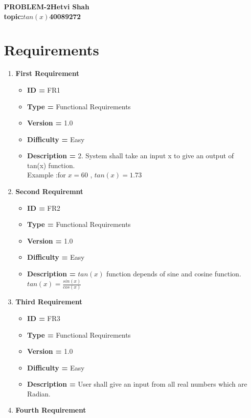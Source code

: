 \documentclass{article}
\begin{document}
\noindent
\Large\textbf{PROBLEM-2}\hfill\textbf{Hetvi Shah}\\
\textbf{topic:$tan(x)$\hfill\textbf{40089272}}
\section*{Requirements}
    \begin{enumerate}\noitemsep
    \item\textbf{First Requirement}
    \begin{itemize}
        \item \textbf{ID = } FR1
        \item \textbf{Type = } Functional Requirements
        \item \textbf{Version = } 1.0
        \item \textbf{Difficulty = } Easy
        \item \textbf{Description = }2.	System shall take an input x to give an output of tan(x) function.\\
        Example :for  $x = 60 $ , $ tan(x) = 1.73$
    \end{itemize}
    \item\textbf{Second Requiremnt}
    \begin{itemize}
        \item \textbf{ID = } FR2
        \item \textbf{Type = } Functional Requirements
        \item \textbf{Version = } 1.0
        \item \textbf{Difficulty = } Easy
        \item \textbf{Description = } $tan(x)$ function depends of sine and cosine function.\\
        $tan(x) = \frac{sin(x)}{cos(x)}$
    \end{itemize}
    \item\textbf{Third Requirement}
    \begin{itemize}
        \item \textbf{ID = } FR3
        \item \textbf{Type = } Functional Requirements
        \item \textbf{Version = } 1.0
        \item \textbf{Difficulty = } Easy
        \item \textbf{Description = }  User shall give an input from all real numbers which are Radian.  
    \end{itemize}
    \newpage
    \item\textbf{Fourth  Requirement}

\end{enumerate}
\end{document}
